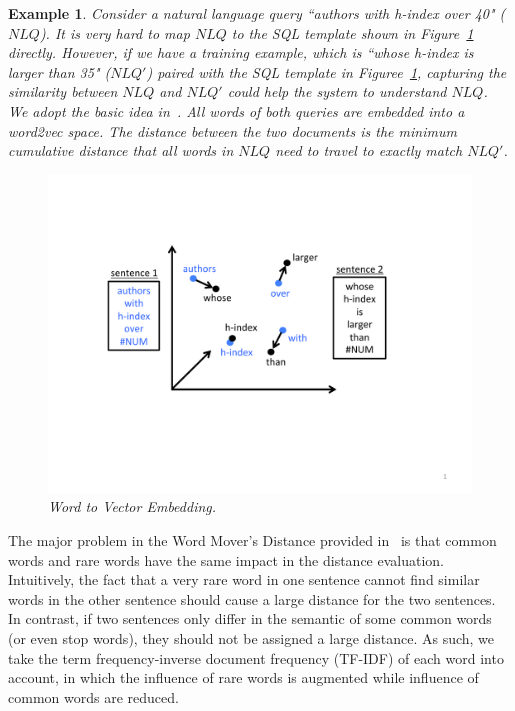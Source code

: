 \documentclass{vldb}
\newtheorem{example}{Example}
\begin{document}
\begin{example}
Consider a natural language query ``authors with h-index over 40" ($\mathit{NLQ}$).  It is very hard to map $\mathit{NLQ}$ to the SQL template shown in Figure~\ref{fig:sampleTemplate} directly.  However, if we have a training example, which is ``whose h-index is larger than 35" ($\mathit{NLQ'}$) paired with the SQL template in Figuree~\ref{fig:sampleTemplate}, capturing the similarity between $\mathit{NLQ}$ and $\mathit{NLQ'}$ could help the system to understand $\mathit{NLQ}$.  We adopt the basic idea in~\cite{DBLP:conf/icml/KusnerGGW15}.  All words of both queries are embedded into a word2vec space.  The distance between the two documents is the minimum cumulative distance that all words in $\mathit{NLQ}$ need to travel to exactly match $\mathit{NLQ'}$.  
\begin{figure}[h]
\center
\includegraphics[width=0.9\linewidth]{pic/word2vec.pdf}
\caption{Word to Vector Embedding.}
\label{fig:sampleTemplate}
\end{figure}
\end{example}

The major problem in the Word Mover's Distance provided in~\cite{DBLP:conf/icml/KusnerGGW15} is that common words and rare words have the same impact in the distance evaluation.  Intuitively, the fact that a very rare word in one sentence cannot find similar words in the other sentence should cause a large distance for the two sentences.  In contrast, if two sentences only differ in the semantic of some common words (or even stop words), they should not be assigned a large distance.  As such, we take the term frequency-inverse document frequency (TF-IDF) of each word into account, in which the influence of rare words is augmented while influence of common words are reduced.  
\end{document}
